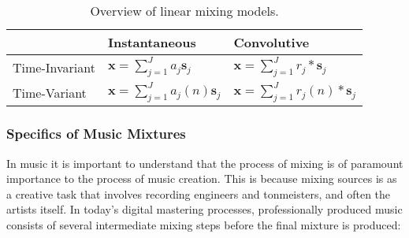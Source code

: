 \begin{table}[]
    \centering
\begin{longtable}[]{lll}
\toprule
\begin{minipage}[b]{0.26\columnwidth}\raggedright
\strut
\end{minipage} & \begin{minipage}[b]{0.42\columnwidth}\raggedright
Instantaneous\strut
\end{minipage} & \begin{minipage}[b]{0.23\columnwidth}\raggedright
Convolutive\strut
\end{minipage}\tabularnewline
\midrule
\endhead
\begin{minipage}[t]{0.26\columnwidth}\raggedright
Time-Invariant\strut
\end{minipage} & \begin{minipage}[t]{0.42\columnwidth}\raggedright
\(\mathbf{x}=\sum_{j=1}^{J}a_j\mathbf{s}_j\)\strut
\end{minipage} & \begin{minipage}[t]{0.23\columnwidth}\raggedright
\(\mathbf{x} = \sum_{j=1}^{J}r_{j} \ast \mathbf{s}_j\)\strut
\end{minipage}\tabularnewline
\begin{minipage}[t]{0.26\columnwidth}\raggedright
Time-Variant\strut
\end{minipage} & \begin{minipage}[t]{0.42\columnwidth}\raggedright
\(\mathbf{x}=\sum_{j=1}^{J}a_j(n)\mathbf{s}_j\)\strut
\end{minipage} & \begin{minipage}[t]{0.23\columnwidth}\raggedright
\(\mathbf{x} = \sum_{j=1}^{J}r_{j}(n) \ast \mathbf{s}_j\)\strut
\end{minipage}\tabularnewline
\bottomrule
\end{longtable}
    \caption{Overview of linear mixing models.}
    \label{tab:mixing_models}
\end{table}

\subsubsection*{Specifics of Music Mixtures}
\label{par:specifics_of_music_mixtures}

In music it is important to understand that the process of mixing is of paramount importance to the process of music creation.
This is because mixing sources is as a creative task that involves recording engineers and tonmeisters, and often the artists itself.
In today's digital mastering processes, professionally produced music consists of several intermediate mixing steps before the final mixture is produced:

